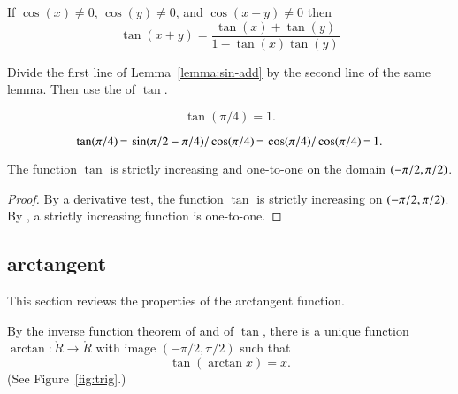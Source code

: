 \begin{lemma}[]
\label{lemma:tan-add}
If $\cos(x)\ne 0$, $\cos(y)\ne 0$, and $\cos(x+y)\ne0$ then
\[ \tan(x+y) = \frac{\tan(x) + \tan(y) }{ 1 -
    \tan(x)\tan(y)}\] 
\end{lemma}
%

\begin{proved}
  Divide the first line of Lemma~\ref{lemma:sin-add} by the second
  line of the same lemma.  Then use the 
  of $\tan$.  \swallowed\end{proved}

\begin{lemma}[]\label{lemma:tan-pi4}
\[ \tan(\pi/4) = 1.\] 
\end{lemma}

\begin{proved}  
\[ 
\tan(\pi/4) \hypermark[def:tan]{\,=\,} \sin(\pi/2-\pi/4)/\cos(\pi/4) 
  \hypermark[lemma:cos-sin]{\,=\,}
  \cos(\pi/4)/\cos(\pi/4) \hypermark[eqn:cospi2]{\,=\,} 1.
\] 
\swallowed\end{proved}

\begin{lemma}[]\label{lemma:tan-monotone}
The function $\tan$ is strictly increasing and one-to-one on the domain
$(-\pi/2,\pi/2)$.
\end{lemma}

\begin{proof} By a derivative test, the function $\tan$ is strictly
  increasing on $(-\pi/2,\pi/2)$.  By
  , a strictly increasing
  function is one-to-one.
\end{proof}

\subsection{arctangent}

This section reviews the properties of the arctangent function.  

\begin{definition}[arctangent]\label{def:arctan}
  By the inverse function theorem of  and  of $\tan$,
  there is a unique function $\arctan:\ring{R}\to\ring{R}$ with image
  $(-\pi/2,\pi/2)$ such that
\begin{equation}\label{eqn:tanarctan}\tan(\arctan x) =x.\end{equation}
(See Figure~\ref{fig:trig}.)
%
\end{definition}
%


